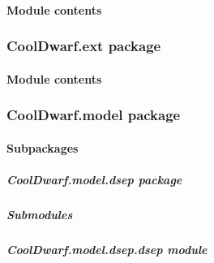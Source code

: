 \documentclass[letterpaper,10pt,english]{sphinxmanual}
\begin{document}
\paragraph{Module contents}
\label{\detokenize{CoolDwarf.err:module-CoolDwarf.err}}\label{\detokenize{CoolDwarf.err:module-contents}}
\sphinxstepscope


\subsubsection{CoolDwarf.ext package}
\label{\detokenize{CoolDwarf.ext:cooldwarf-ext-package}}\label{\detokenize{CoolDwarf.ext::doc}}

\paragraph{Module contents}
\label{\detokenize{CoolDwarf.ext:module-CoolDwarf.ext}}\label{\detokenize{CoolDwarf.ext:module-contents}}
\sphinxstepscope


\subsubsection{CoolDwarf.model package}
\label{\detokenize{CoolDwarf.model:cooldwarf-model-package}}\label{\detokenize{CoolDwarf.model::doc}}

\paragraph{Subpackages}
\label{\detokenize{CoolDwarf.model:subpackages}}
\sphinxstepscope


\subparagraph{CoolDwarf.model.dsep package}
\label{\detokenize{CoolDwarf.model.dsep:cooldwarf-model-dsep-package}}\label{\detokenize{CoolDwarf.model.dsep::doc}}

\subparagraph{Submodules}
\label{\detokenize{CoolDwarf.model.dsep:submodules}}

\subparagraph{CoolDwarf.model.dsep.dsep module}
\label{\detokenize{CoolDwarf.model.dsep:module-CoolDwarf.model.dsep.dsep}}\label{\detokenize{CoolDwarf.model.dsep:cooldwarf-model-dsep-dsep-module}}
\end{document}
